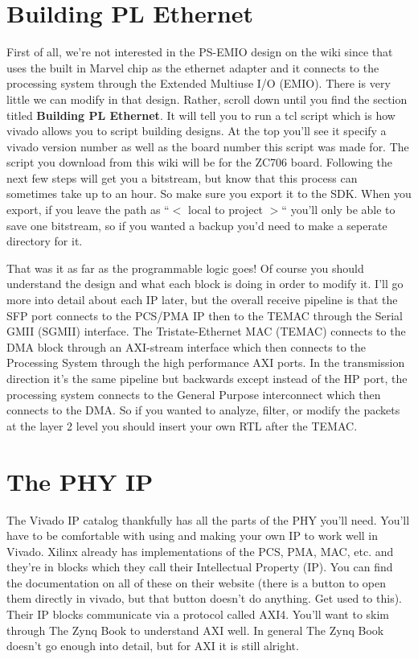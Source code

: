 \documentclass[12pt]{report}
\begin{document}
\section{Building PL Ethernet}
First of all, we're not interested in the PS-EMIO design on the wiki since that uses the built in Marvel chip as the ethernet adapter and it connects to the processing system through the Extended Multiuse I/O (EMIO). There is very little we can modify in that design. Rather, scroll down until you find the section titled \textbf{Building PL Ethernet}. It will tell you to run a tcl script which is how vivado allows you to script building designs. At the top you'll see it specify a vivado version number as well as the board number this script was made for. The script you download from this wiki will be for the ZC706 board. Following the next few steps will get you a bitstream, but know that this process can sometimes take up to an hour. So make sure you export it to the SDK. When you export, if you leave the path as ``$<$ local to project $>$`` you'll only be able to save one bitstream, so if you wanted a backup you'd need to make a seperate directory for it.

That was it as far as the programmable logic goes!
Of course you should understand the design and what each block is doing in order to modify it.
I'll go more into detail about each IP later, but the overall receive pipeline is that the SFP
port connects to the PCS/PMA IP then to the TEMAC through the Serial GMII (SGMII) interface.
The Tristate-Ethernet MAC (TEMAC) connects to the DMA block through an AXI-stream interface
which then connects to the Processing System through the high performance AXI ports.
In the transmission direction it's the same pipeline but backwards except instead of the HP port,
the processing system connects to the General Purpose interconnect which then connects to the DMA.
So if you wanted to analyze, filter, or modify the packets at the layer 2 level you should
insert your own RTL after the TEMAC.

\section{The PHY IP}
The Vivado IP catalog thankfully has all the parts of the PHY you'll need. You'll have to be comfortable with using and making your own IP to work well in Vivado. Xilinx already has implementations of the PCS, PMA, MAC, etc. and they're in blocks which they call their Intellectual Property (IP). You can find the documentation on all of these on their website (there is a button to open them directly in vivado, but that button doesn't do anything. Get used to this). Their IP blocks communicate via a protocol called AXI4. You'll want to skim through The Zynq Book \cite{the_zynq_book} to understand AXI well. In general The Zynq Book doesn't go enough into detail, but for AXI it is still alright.
\end{document}
